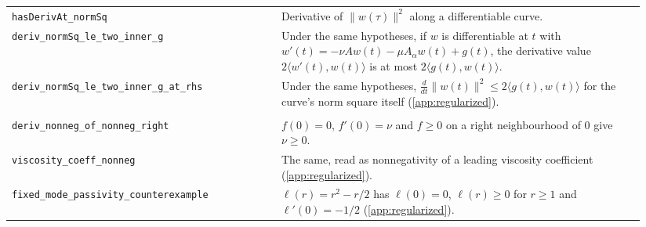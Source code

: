 {\begin{longtable}{>{\raggedright\arraybackslash}p{0.40\linewidth}
                  >{\raggedright\arraybackslash}p{0.54\linewidth}}
\nolinkurl{hasDerivAt_normSq} & Derivative of $\|w(\tau)\|^2$ along a differentiable curve. \\
\nolinkurl{deriv_normSq_le_two_inner_g} & Under the same hypotheses, if $w$ is differentiable at $t$ with $w'(t)=-\nu Aw(t)-\mu A_\alpha w(t)+g(t)$, the derivative value $2\langle w'(t),w(t)\rangle$ is at most $2\langle g(t),w(t)\rangle$. \\
\nolinkurl{deriv_normSq_le_two_inner_g_at_rhs} & Under the same hypotheses, $\frac{d}{dt}\|w(t)\|^2\le2\langle g(t),w(t)\rangle$ for the curve's norm square itself (\cref{app:regularized}). \\
\addlinespace
\multicolumn{2}{l}{\nolinkurl{Multiplier.lean}} \\
\nolinkurl{deriv_nonneg_of_nonneg_right} & $f(0)=0$, $f'(0)=\nu$ and $f\ge0$ on a right neighbourhood of $0$ give $\nu\ge0$. \\
\nolinkurl{viscosity_coeff_nonneg} & The same, read as nonnegativity of a leading viscosity coefficient (\cref{app:regularized}). \\
\nolinkurl{fixed_mode_passivity_counterexample} & $\ell(r)=r^2-r/2$ has $\ell(0)=0$, $\ell(r)\ge0$ for $r\ge1$ and $\ell'(0)=-1/2$ (\cref{app:regularized}). \\
\end{longtable}
}
